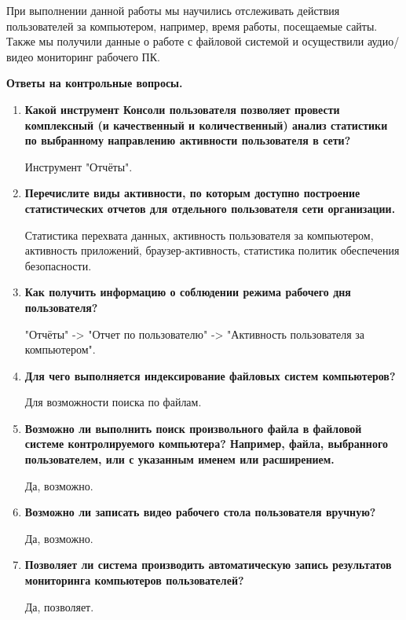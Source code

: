 \documentclass[a4paper,14pt]{extarticle}
\begin{document}
    При выполнении данной работы мы научились отслеживать действия пользователей за компьютером,
    например, время работы, посещаемые сайты. Также мы получили данные о работе с файловой системой 
    и осуществили аудио/видео мониторинг рабочего ПК.
    
    \textbf{Ответы на контрольные вопросы.}
    \begin{enumerate}
        \item \textbf{ Какой инструмент Консоли пользователя позволяет провести комплексный
    (и качественный и количественный) анализ статистики по выбранному направлению
    активности пользователя в сети? }

    \qquad Инструмент "Отчёты".
        \item \textbf{ Перечислите виды активности, по которым доступно построение
    статистических отчетов для отдельного пользователя сети организации. }

    \qquad Статистика перехвата данных, активность пользователя за компьютером, активность приложений,
    браузер-активность, статистика политик обеспечения безопасности.
        \item \textbf{ Как получить информацию о соблюдении режима рабочего дня
    пользователя? }

    \qquad "Отчёты" -> "Отчет по пользователю" -> "Активность пользователя за компьютером".
        \item \textbf{ Для чего выполняется индексирование файловых систем компьютеров? }

    \qquad Для возможности поиска по файлам.
        \item \textbf{ Возможно ли выполнить поиск произвольного файла в файловой системе
    контролируемого компьютера? Например, файла, выбранного пользователем, или с
    указанным именем или расширением. }

    \qquad Да, возможно.
        \item \textbf{ Возможно ли записать видео рабочего стола пользователя вручную? }

    \qquad Да, возможно.
        \item \textbf{ Позволяет ли система производить автоматическую запись результатов
    мониторинга компьютеров пользователей? }

    \qquad Да, позволяет.
    \end{enumerate}
    
\end{document}
